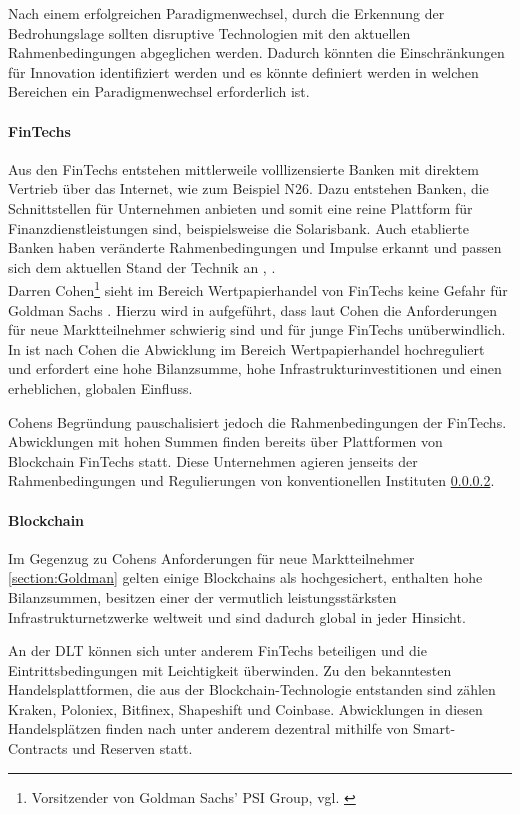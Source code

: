 Nach einem erfolgreichen Paradigmenwechsel, durch die Erkennung der Bedrohungslage sollten disruptive Technologien mit den aktuellen Rahmenbedingungen abgeglichen werden. Dadurch könnten die Einschränkungen für Innovation identifiziert werden und es könnte definiert werden in welchen Bereichen ein Paradigmenwechsel erforderlich ist.

\paragraph{FinTechs}
\label{Disruption:FinTechs}
Aus den FinTechs entstehen mittlerweile volllizensierte Banken mit direktem Vertrieb über das Internet, wie zum Beispiel N26. Dazu entstehen Banken, die Schnittstellen für Unternehmen anbieten und somit eine reine Plattform für Finanzdienstleistungen sind, beispielsweise die Solarisbank. Auch etablierte Banken haben veränderte Rahmenbedingungen und Impulse erkannt und passen sich dem aktuellen Stand der Technik an \cite{Gupta:2017}, \cite{Eismann2015}.
\medskip
\\
Darren Cohen\footnote{Vorsitzender von Goldman Sachs' PSI Group, vgl. \cite{Gupta:2017}} sieht im Bereich Wertpapierhandel von FinTechs keine Gefahr für Goldman Sachs \cite{Gupta:2017}.
Hierzu wird in \cite{Gupta:2017} aufgeführt, dass laut Cohen die Anforderungen für neue Marktteilnehmer schwierig sind und für junge FinTechs unüberwindlich. In \cite{Gupta:2017} ist nach Cohen die Abwicklung im Bereich Wertpapierhandel hochreguliert und erfordert eine hohe Bilanzsumme, hohe Infrastrukturinvestitionen und einen erheblichen, globalen Einfluss.

Cohens Begründung pauschalisiert jedoch die Rahmenbedingungen der FinTechs. Abwicklungen mit hohen Summen finden bereits über Plattformen von Blockchain FinTechs statt. Diese Unternehmen agieren jenseits der Rahmenbedingungen und Regulierungen von konventionellen Instituten \ref{Disruption:Blockchain}.

\paragraph{Blockchain}
\label{Disruption:Blockchain}
Im Gegenzug zu Cohens Anforderungen für neue Marktteilnehmer \ref{section:Goldman} gelten einige Blockchains als hochgesichert, enthalten hohe Bilanzsummen, besitzen einer der vermutlich leistungsstärksten Infrastrukturnetzwerke weltweit und sind dadurch global in jeder Hinsicht.

An der \ac{DLT} können sich unter anderem FinTechs beteiligen und die Eintrittsbedingungen mit Leichtigkeit überwinden. Zu den bekanntesten Handelsplattformen, die aus der Blockchain-Technologie entstanden sind zählen Kraken, Poloniex, Bitfinex, Shapeshift und Coinbase. Abwicklungen in diesen Handelsplätzen finden nach \citet{Foundation2019Deconstructing} unter anderem dezentral mithilfe von Smart-Contracts und Reserven statt.

